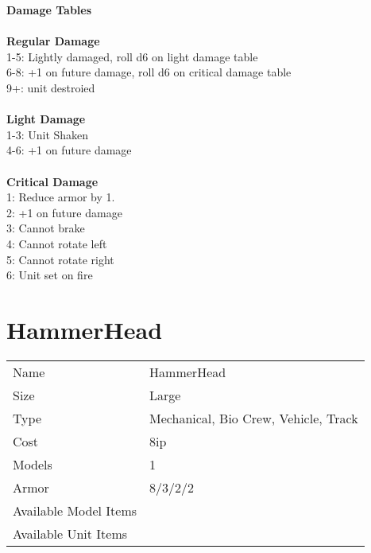 {\bf Damage Tables} \\
\ \\ {\bf Regular Damage } \\
1-5: Lightly damaged, roll d6 on light damage table \\
6-8: +1 on future damage, roll d6 on critical damage table \\
9+: unit destroied \\
\ \\ {\bf Light Damage } \\
1-3: Unit Shaken \\
4-6: +1 on future damage \\
\ \\ {\bf Critical Damage  } \\
1: Reduce armor by 1. \\
2: +1 on future damage \\
3: Cannot brake \\
4: Cannot rotate left \\
5: Cannot rotate right \\
6: Unit set on fire \\









\pagebreak

\section{ HammerHead }

\begin{tabular}{ll}
  Name & HammerHead \\
  Size & Large\\
  Type & Mechanical, Bio Crew, Vehicle, Track\\
  Cost & 8ip\\
  Models & 1\\
  Armor & 8/3/2/2\\
  Available Model Items &  \\
  Available Unit Items &  \\
\end{tabular}

